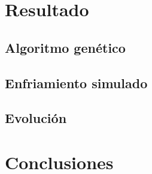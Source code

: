 \documentclass[11pt,spanish,listoffigures,listoftables]{tfgetsinf}
\begin{document}
\begin{itemize}
\chapter{Resultado}

\section{Algoritmo genético}

\section{Enfriamiento simulado}

\section{Evolución}


\chapter{Conclusiones}

\cleardoublepage
\printbibliography



\end{itemize}
\end{document}

